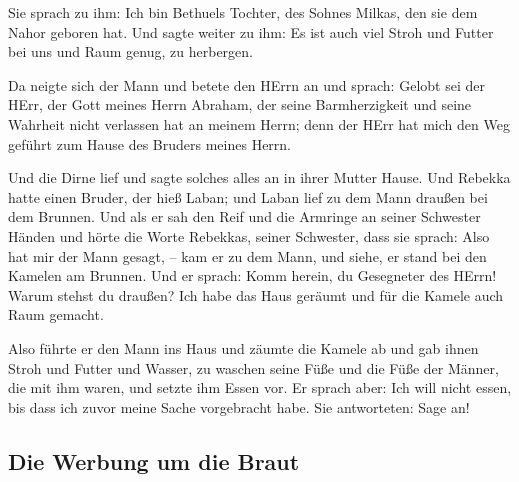  Sie sprach zu ihm: Ich bin Bethuels Tochter, des Sohnes
Milkas, den sie dem Nahor geboren hat.  Und sagte weiter
zu ihm: Es ist auch viel Stroh und Futter bei uns und Raum genug, zu
herbergen.

 Da neigte sich der Mann und betete den HErrn an
 und sprach: Gelobt sei der HErr, der Gott meines Herrn
Abraham, der seine Barmherzigkeit und seine Wahrheit nicht verlassen hat
an meinem Herrn; denn der HErr hat mich den Weg geführt zum Hause des
Bruders meines Herrn.

 Und die Dirne lief und sagte solches alles an in ihrer
Mutter Hause.  Und Rebekka hatte einen Bruder, der hieß
Laban; und Laban lief zu dem Mann draußen bei dem Brunnen.
 Und als er sah den Reif und die Armringe an seiner
Schwester Händen und hörte die Worte Rebekkas, seiner Schwester, dass
sie sprach: Also hat mir der Mann gesagt, -- kam er zu dem Mann, und
siehe, er stand bei den Kamelen am Brunnen.  Und er
sprach: Komm herein, du Gesegneter des HErrn! Warum stehst du draußen?
Ich habe das Haus geräumt und für die Kamele auch Raum gemacht.

 Also führte er den Mann ins Haus und zäumte die Kamele
ab und gab ihnen Stroh und Futter und Wasser, zu waschen seine Füße und
die Füße der Männer, die mit ihm waren,  und setzte ihm
Essen vor. Er sprach aber: Ich will nicht essen, bis dass ich zuvor
meine Sache vorgebracht habe. Sie antworteten: Sage an!

\hypertarget{die-werbung-um-die-braut}{%
\subsection{Die Werbung um die Braut}\label{die-werbung-um-die-braut}}

